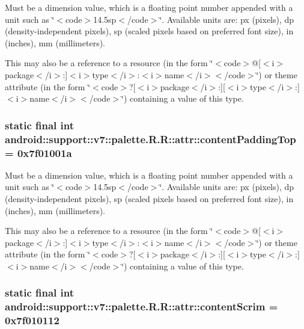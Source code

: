 Must be a dimension value, which is a floating point number appended with a unit such as \char`\"{}$<$code$>$14.5sp$<$/code$>$\char`\"{}. Available units are: px (pixels), dp (density-independent pixels), sp (scaled pixels based on preferred font size), in (inches), mm (millimeters). 

This may also be a reference to a resource (in the form \char`\"{}$<$code$>$@\mbox{[}$<$i$>$package$<$/i$>$:\mbox{]}$<$i$>$type$<$/i$>$:$<$i$>$name$<$/i$>$$<$/code$>$\char`\"{}) or theme attribute (in the form \char`\"{}$<$code$>$?\mbox{[}$<$i$>$package$<$/i$>$:\mbox{]}\mbox{[}$<$i$>$type$<$/i$>$:\mbox{]}$<$i$>$name$<$/i$>$$<$/code$>$\char`\"{}) containing a value of this type. \hypertarget{classandroid_1_1support_1_1v7_1_1palette_1_1_r_1_1attr_cf09348c470a3e4526a71212a4290403}{
\subsubsection[{contentPaddingTop}]{\setlength{\rightskip}{0pt plus 5cm}static final int android::support::v7::palette.R.R::attr::contentPaddingTop = 0x7f01001a}}
\label{classandroid_1_1support_1_1v7_1_1palette_1_1_r_1_1attr_cf09348c470a3e4526a71212a4290403}


Must be a dimension value, which is a floating point number appended with a unit such as \char`\"{}$<$code$>$14.5sp$<$/code$>$\char`\"{}. Available units are: px (pixels), dp (density-independent pixels), sp (scaled pixels based on preferred font size), in (inches), mm (millimeters). 

This may also be a reference to a resource (in the form \char`\"{}$<$code$>$@\mbox{[}$<$i$>$package$<$/i$>$:\mbox{]}$<$i$>$type$<$/i$>$:$<$i$>$name$<$/i$>$$<$/code$>$\char`\"{}) or theme attribute (in the form \char`\"{}$<$code$>$?\mbox{[}$<$i$>$package$<$/i$>$:\mbox{]}\mbox{[}$<$i$>$type$<$/i$>$:\mbox{]}$<$i$>$name$<$/i$>$$<$/code$>$\char`\"{}) containing a value of this type. \hypertarget{classandroid_1_1support_1_1v7_1_1palette_1_1_r_1_1attr_077268be42cb6198939193ab2f30f832}{
\subsubsection[{contentScrim}]{\setlength{\rightskip}{0pt plus 5cm}static final int android::support::v7::palette.R.R::attr::contentScrim = 0x7f010112}}
\label{classandroid_1_1support_1_1v7_1_1palette_1_1_r_1_1attr_077268be42cb6198939193ab2f30f832}


